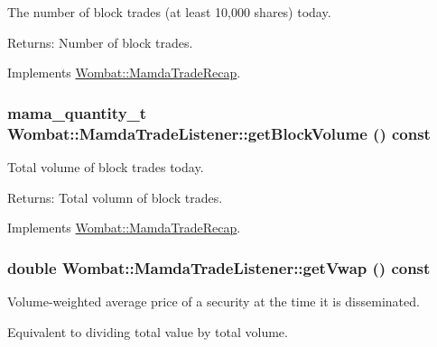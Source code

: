 The number of block trades (at least 10,000 shares) today. 

\begin{Desc}
\item[Returns:]Number of block trades. \end{Desc}


Implements \hyperlink{classWombat_1_1MamdaTradeRecap_083bcc57e26be2e79bd391b8a2177e3f}{Wombat::Mamda\-Trade\-Recap}.\hypertarget{classWombat_1_1MamdaTradeListener_5d1de91179c83b06f897ee66c93174c1}{
\subsubsection[getBlockVolume]{\setlength{\rightskip}{0pt plus 5cm}mama\_\-quantity\_\-t Wombat::Mamda\-Trade\-Listener::get\-Block\-Volume () const}}
\label{classWombat_1_1MamdaTradeListener_5d1de91179c83b06f897ee66c93174c1}


Total volume of block trades today. 

\begin{Desc}
\item[Returns:]Total volumn of block trades. \end{Desc}


Implements \hyperlink{classWombat_1_1MamdaTradeRecap_dc17d00de0594da995227b3f915d5fda}{Wombat::Mamda\-Trade\-Recap}.\hypertarget{classWombat_1_1MamdaTradeListener_3ca5f333c3c1962ad59dc7f87e6ea053}{
\subsubsection[getVwap]{\setlength{\rightskip}{0pt plus 5cm}double Wombat::Mamda\-Trade\-Listener::get\-Vwap () const}}
\label{classWombat_1_1MamdaTradeListener_3ca5f333c3c1962ad59dc7f87e6ea053}


Volume-weighted average price of a security at the time it is disseminated. 

Equivalent to dividing total value by total volume.

